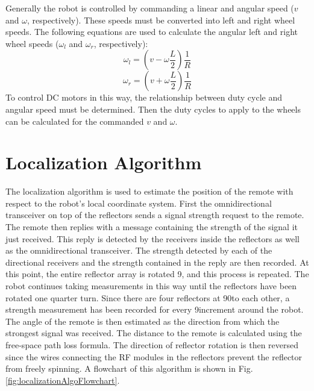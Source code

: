 \vspace*{12pt}
\noindent
Generally the robot is controlled by commanding a linear and angular speed ($v$ and $\omega$, respectively). These speeds must be converted into left and right wheel speeds. The following equations are used to calculate the angular left and right wheel speeds ($\omega_l$ and $\omega_r$, respectively):
$$\omega_l = \left(v - \omega\frac{L}{2}\right)\frac{1}{R}$$
$$\omega_r = \left(v + \omega\frac{L}{2}\right)\frac{1}{R}$$
To control DC motors in this way, the relationship between duty cycle and angular speed must be determined. Then the duty cycles to apply to the wheels can be calculated for the commanded $v$ and $\omega$.

\section{Localization Algorithm}
The localization algorithm is used to estimate the position of the remote with respect to the robot's local coordinate system. First the omnidirectional transceiver on top of the reflectors sends a signal strength request to the remote. The remote then replies with a message containing the strength of the signal it just received. This reply is detected by the receivers inside the reflectors as well as the omnidirectional transceiver. The strength detected by each of the directional receivers and the strength contained in the reply are then recorded. At this point, the entire reflector array is rotated 9\textdegree, and this process is repeated. The robot continues taking measurements in this way until the reflectors have been rotated one quarter turn. Since there are four reflectors at 90\textdegree to each other, a strength measurement has been recorded for every 9\textdegree increment around the robot. The angle of the remote is then estimated as the direction from which the strongest signal was received. The distance to the remote is calculated using the free-space path loss formula. The direction of reflector rotation is then reversed since the wires connecting the RF modules in the reflectors prevent the reflector from freely spinning. A flowchart of this algorithm is shown in Fig. \ref{fig:localizationAlgoFlowchart}.
